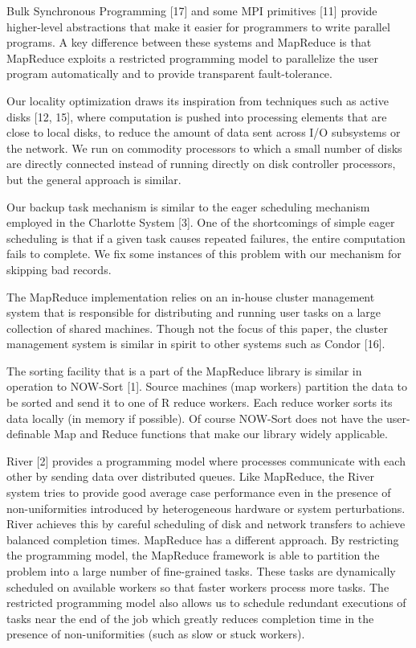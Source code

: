 \documentclass[
]{article}
\begin{document}
Bulk Synchronous Programming {[}17{]} and some MPI primitives {[}11{]}
provide higher-level abstractions that make it easier for programmers to
write parallel programs. A key difference between these systems and
MapReduce is that MapReduce exploits a restricted programming model to
parallelize the user program automatically and to provide transparent
fault-tolerance.

Our locality optimization draws its inspiration from techniques such as
active disks {[}12, 15{]}, where computation is pushed into processing
elements that are close to local disks, to reduce the amount of data
sent across I/O subsystems or the network. We run on commodity
processors to which a small number of disks are directly connected
instead of running directly on disk controller processors, but the
general approach is similar.

Our backup task mechanism is similar to the eager scheduling mechanism
employed in the Charlotte System {[}3{]}. One of the shortcomings of
simple eager scheduling is that if a given task causes repeated
failures, the entire computation fails to complete. We fix some
instances of this problem with our mechanism for skipping bad records.

The MapReduce implementation relies on an in-house cluster management
system that is responsible for distributing and running user tasks on a
large collection of shared machines. Though not the focus of this paper,
the cluster management system is similar in spirit to other systems such
as Condor {[}16{]}.

The sorting facility that is a part of the MapReduce library is similar
in operation to NOW-Sort {[}1{]}. Source machines (map workers)
partition the data to be sorted and send it to one of R reduce workers.
Each reduce worker sorts its data locally (in memory if possible). Of
course NOW-Sort does not have the user-definable Map and Reduce
functions that make our library widely applicable.

River {[}2{]} provides a programming model where processes communicate
with each other by sending data over distributed queues. Like MapReduce,
the River system tries to provide good average case performance even in
the presence of non-uniformities introduced by heterogeneous hardware or
system perturbations. River achieves this by careful scheduling of disk
and network transfers to achieve balanced completion times. MapReduce
has a different approach. By restricting the programming model, the
MapReduce framework is able to partition the problem into a large number
of fine-grained tasks. These tasks are dynamically scheduled on
available workers so that faster workers process more tasks. The
restricted programming model also allows us to schedule redundant
executions of tasks near the end of the job which greatly reduces
completion time in the presence of non-uniformities (such as slow or
stuck workers).
\end{document}
